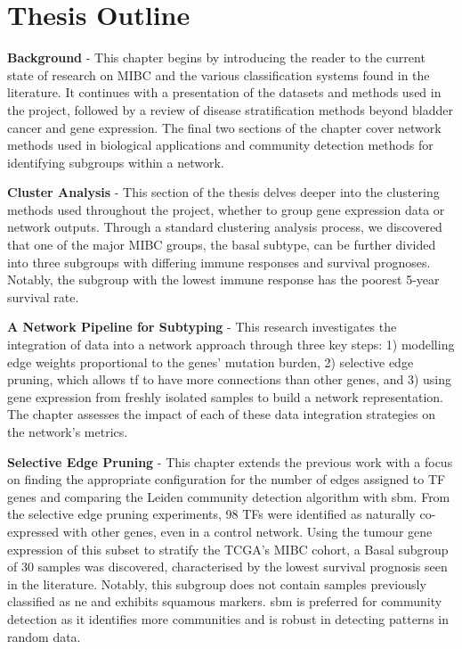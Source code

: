 \section*{Thesis Outline}

\textbf{Background} - This chapter begins by introducing the reader to the current state of research on MIBC and the various classification systems found in the literature. It continues with a presentation of the datasets and methods used in the project, followed by a review of disease stratification methods beyond bladder cancer and gene expression. The final two sections of the chapter cover network methods used in biological applications and community detection methods for identifying subgroups within a network.


\textbf{Cluster Analysis} - This section of the thesis delves deeper into the clustering methods used throughout the project, whether to group gene expression data or network outputs. Through a standard clustering analysis process, we discovered that one of the major MIBC groups, the basal subtype, can be further divided into three subgroups with differing immune responses and survival prognoses. Notably, the subgroup with the lowest immune response has the poorest 5-year survival rate.

\textbf{A Network Pipeline for Subtyping} - This research investigates the integration of data into a network approach through three key steps: 1) modelling edge weights proportional to the genes' mutation burden, 2) selective edge pruning, which allows \acrlong{tf} to have more connections than other genes, and 3) using gene expression from freshly isolated samples to build a network representation. The chapter assesses the impact of each of these data integration strategies on the network's metrics.


\textbf{Selective Edge Pruning} - This chapter extends the previous work with a focus on finding the appropriate configuration for the number of edges assigned to TF genes and comparing the Leiden community detection algorithm with \acrfull{sbm}. From the selective edge pruning experiments, 98 TFs were identified as naturally co-expressed with other genes, even in a control network. Using the tumour gene expression of this subset to stratify the TCGA's MIBC cohort, a Basal subgroup of 30 samples was discovered, characterised by the lowest survival prognosis seen in the literature. Notably, this subgroup does not contain samples previously classified as \acrlong{ne} and exhibits squamous markers. \acrshort{sbm} is preferred for community detection as it identifies more communities and is robust in detecting patterns in random data.


